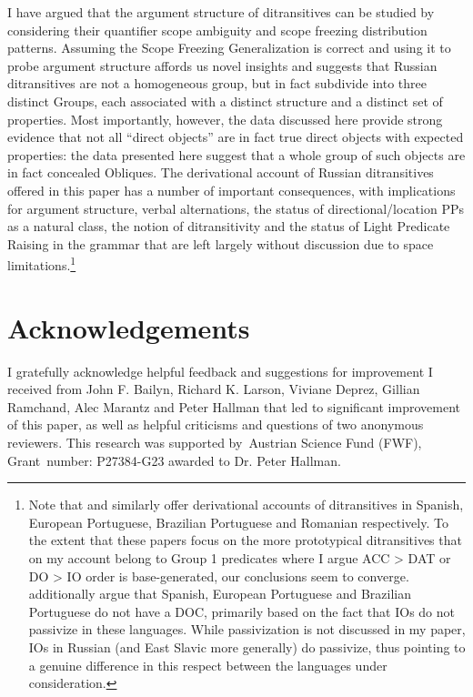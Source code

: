\documentclass[output=paper,colorlinks,citecolor=brown,modfonts,nonflat]{langsci/langscibook}
\begin{document}
I have argued that the argument structure of ditransitives can be studied by considering their quantifier scope ambiguity and scope freezing distribution patterns. Assuming the Scope Freezing Generalization is correct and using it to probe argument structure affords us novel insights and suggests that Russian ditransitives are not a homogeneous group, but in fact subdivide into three distinct Groups, each associated with a distinct structure and a distinct set of properties. Most importantly, however, the data discussed here provide strong evidence that not all “direct objects” are in fact true direct objects with expected properties: the data presented here suggest that a whole group of such objects are in fact concealed Obliques. The derivational account of Russian ditransitives offered in this paper has a number of important consequences, with implications for argument structure, verbal alternations, the status of directional/location PPs as a natural class, the notion of ditransitivity and the status of Light Predicate Raising in the grammar that are left largely without discussion due to space limitations.\footnote{Note that  and  similarly offer derivational accounts of ditransitives in Spanish, European Portuguese, Brazilian Portuguese and Romanian respectively. To the extent that these papers focus on the more prototypical ditransitives that on my account belong to Group 1 predicates where I argue ACC > DAT or DO > IO order is base-generated, our conclusions seem to converge.  additionally argue that Spanish, European Portuguese and Brazilian Portuguese do not have a DOC, primarily based on the fact that IOs do not passivize in these languages. While passivization is not discussed in my paper, IOs in Russian (and East Slavic more generally) do passivize, thus pointing to a genuine difference in this respect between the languages under consideration.}

\section*{Acknowledgements}
I gratefully acknowledge helpful feedback and suggestions for improvement I received from John F. Bailyn, Richard K. Larson, Viviane Deprez, Gillian Ramchand, Alec Marantz and Peter Hallman that led to significant improvement of this paper, as well as helpful criticisms and questions of two anonymous reviewers. This research was supported by~Austrian Science Fund (FWF), Grant~number: P27384-G23 awarded to Dr. Peter Hallman.

\sloppy
\printbibliography[heading=subbibliography,notkeyword=this]
\end{document}
